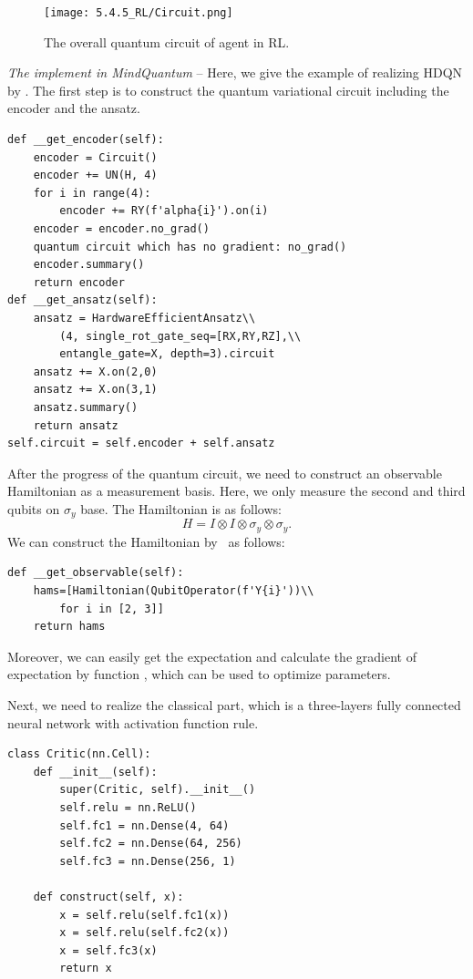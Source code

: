 \begin{figure}[ht]
  \centering
  \texttt{[image: 5.4.5\_RL/Circuit.png]}
  \caption{\label{Agent_qc} The overall quantum circuit of agent in RL.}
\end{figure}

\textit{The implement in MindQuantum} -- Here, we give the example of realizing HDQN by \MindQuantum. The first step is to construct the quantum variational circuit including the encoder and the ansatz.
\begin{lstlisting}
def __get_encoder(self):
    encoder = Circuit()
    encoder += UN(H, 4)
    for i in range(4):
        encoder += RY(f'alpha{i}').on(i)
    encoder = encoder.no_grad()
    quantum circuit which has no gradient: no_grad()
    encoder.summary()
    return encoder
def __get_ansatz(self):
    ansatz = HardwareEfficientAnsatz\\
        (4, single_rot_gate_seq=[RX,RY,RZ],\\
        entangle_gate=X, depth=3).circuit
    ansatz += X.on(2,0)
    ansatz += X.on(3,1)
    ansatz.summary()
    return ansatz
self.circuit = self.encoder + self.ansatz
\end{lstlisting}

After the progress of the quantum circuit, we need to construct an observable Hamiltonian as a measurement basis. Here, we only measure the second and third qubits on $\sigma_y$ base. The Hamiltonian is as follows:
\begin{equation}
    H=I\otimes I\otimes\sigma_y\otimes\sigma_y.
\end{equation}
We can construct the Hamiltonian by \MindQuantum\ as follows:
\begin{lstlisting}
def __get_observable(self):
    hams=[Hamiltonian(QubitOperator(f'Y{i}'))\\
        for i in [2, 3]]
    return hams
\end{lstlisting}
Moreover, we can easily get the expectation and calculate the gradient of expectation by function \getexpectationwithgrad, which can be used to optimize parameters.

Next, we need to realize the classical part, which is a three-layers fully connected neural network with activation function rule.
\begin{lstlisting}
class Critic(nn.Cell):
    def __init__(self):
        super(Critic, self).__init__()
        self.relu = nn.ReLU()
        self.fc1 = nn.Dense(4, 64)
        self.fc2 = nn.Dense(64, 256)
        self.fc3 = nn.Dense(256, 1)

    def construct(self, x):
        x = self.relu(self.fc1(x))
        x = self.relu(self.fc2(x))
        x = self.fc3(x)
        return x
\end{lstlisting}

